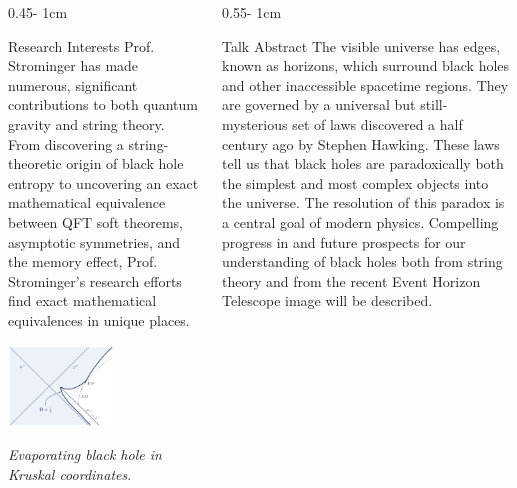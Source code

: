 \documentclass{../psuposter}
\begin{document}
\begin{frame}
\begin{columns}[t, totalwidth=\textwidth]
\begin{column}{0.45\textwidth - 1cm}
    \begin{block}{Research Interests}
        Prof. Strominger has made numerous, significant contributions to both quantum gravity and string theory. From discovering a string-theoretic origin of black hole entropy to uncovering an exact mathematical equivalence between QFT soft theorems, asymptotic symmetries, and the memory effect, Prof. Strominger's research efforts find exact mathematical equivalences in unique places.
        \begin{center}
	    	\includegraphics[width=0.55\textwidth]{images/kruskal}    		
    	\end{center}
    	\textit{Evaporating black hole in Kruskal coordinates}. \cite{hartmanIslandsAsymptoticallyFlat2020}
    \end{block}
\end{column}
\begin{column}{0.55\textwidth - 1cm}


    \begin{block}{Talk Abstract}
        The visible universe has edges, known as horizons, which surround black holes and other inaccessible spacetime regions. They are governed by a universal but still-mysterious set of laws discovered a half century ago by Stephen Hawking. These laws tell us that black holes are paradoxically both the simplest and most complex objects into the universe. The resolution of this paradox is a central goal of modern physics. Compelling progress in and future prospects for our understanding of black holes both from string theory and from the recent Event Horizon Telescope image will be described. 
    \end{block}



\end{column}
\end{columns}
\end{frame}
\end{document}
